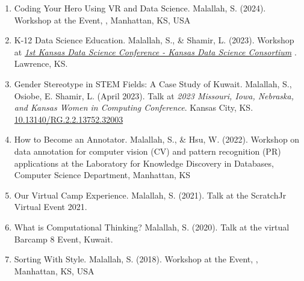 \documentclass[11pt]{article}
\begin{document}
\begin{enumerate}
\item Coding Your Hero Using VR and Data Science. Malallah, S. (2024). Workshop at the { } Event,  {, Manhattan, KS, USA  }


\item  K-12 Data Science Education. Malallah, S., \& Shamir, L. (2023). Workshop at \textit{\href{https://nsfepscor.ku.edu/2023/05/23/data-science-on-display/}{1st Kansas Data Science Conference - Kansas Data Science Consortium} }. Lawrence, KS. {\href{https://www.linkedin.com/posts/safiamalallah_our-esteemed-team-comprising-members-from-activity-7059951265413279744-z3gf?utm_source=share&utm_medium=member_desktop}{\color{icnclr} \faGlobe[regular] }}


\item  Gender Stereotype in STEM Fields: A Case Study of Kuwait. Malallah, S., Osiobe, E. Shamir, L. (April 2023). Talk at \textit{2023 Missouri, Iowa, Nebraska, and Kansas Women in Computing Conference}. Kansas City, KS. \href{https://doi.org/10.13140/RG.2.2.13752.32003}{10.13140/RG.2.2.13752.32003}



\item How to Become an Annotator. Malallah, S., \& Hsu, W. (2022). Workshop on data annotation for computer vision (CV) and pattern recognition (PR) applications at the  Laboratory for Knowledge Discovery in Databases, Computer Science Department, Manhattan, KS {\href{https://www.kddresearch.org/page/research-cv-annotation#gsc.tab=0}{\color{icnclr} \faGlobe[regular] }}


\item Our Virtual Camp Experience. Malallah, S. (2021). Talk at the ScratchJr Virtual Event 2021. {\href{https://youtu.be/8DHLORFX0dY?si=Jg6yeiA0Rj-QJwAb&t=1852}{\color{icnclr} \faCaretSquareRight[regular] }} 


\item What is Computational Thinking? Malallah, S. (2020). Talk at the virtual Barcamp 8 Event, Kuwait. {\href{https://www.youtube.com/watch?v=geX029dhihk&t=5s}{\color{icnclr} \faCaretSquareRight[regular] }} {\href{https://barcampkw.wordpress.com/2020/06/18/barcamp-kuwait-eight-speakers-and-presentations/}{\color{icnclr} \faGlobe[regular] }}

\item Sorting With Style. Malallah, S. (2018). Workshop at the { } Event,  {, Manhattan, KS, USA  }



\end{enumerate}
\end{document}
